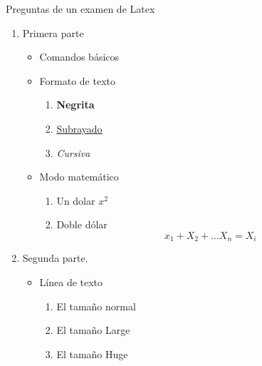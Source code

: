 \documentclass[10pt,a4paper]{article}
\begin{document}
 Preguntas de un examen de Latex
  \begin{enumerate}
   \item Primera parte
    \begin{itemize}
     \item Comandos básicos
     \item Formato de texto
      \begin{enumerate}
       \item {\bf Negrita}
       \item \underline{Subrayado}
       \item {\em Cursiva}
      \end{enumerate}
     \item Modo matemático
      \begin{enumerate}
       \item Un dolar $x^2$
       \item Doble dólar $$x_1 + X_2 + … X_n = X_i $$
      \end{enumerate}
	\end{itemize}
   \item Segunda parte.
    \begin{itemize}
     \item Línea de texto
      \begin{enumerate}
       \item {\normalsize El tamaño normal}
       \item {\Large El tamaño Large}
       \item {\huge El tamaño Huge}
      \end{enumerate}
    \end{itemize}
  \end{enumerate}
\end{document}
